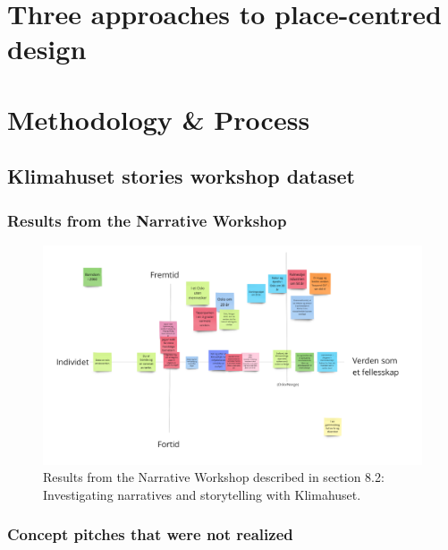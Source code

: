 \section{Three approaches to place-centred design}


\section{Methodology & Process}

\subsection{Klimahuset stories workshop dataset}



\subsubsection{Results from the Narrative Workshop}
\begin{figure}[H]
\includegraphics[width=12.5cm]{pictures/process/workshop_results.png}
\caption{Results from the Narrative Workshop described in section 8.2: Investigating narratives and storytelling with Klimahuset.}
\centering 
\end{figure}

\subsubsection{Concept pitches that were not realized}

